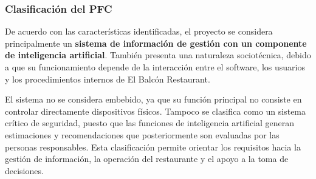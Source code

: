 \subsubsection{Clasificación del PFC}

De acuerdo con las características identificadas, el proyecto se considera
principalmente un \textbf{sistema de información de gestión con un componente
de inteligencia artificial}. También presenta una naturaleza sociotécnica,
debido a que su funcionamiento depende de la interacción entre el software,
los usuarios y los procedimientos internos de El Balcón Restaurant.

El sistema no se considera embebido, ya que su función principal no consiste
en controlar directamente dispositivos físicos. Tampoco se clasifica como un
sistema crítico de seguridad, puesto que las funciones de inteligencia
artificial generan estimaciones y recomendaciones que posteriormente son
evaluadas por las personas responsables. Esta clasificación permite orientar
los requisitos hacia la gestión de información, la operación del restaurante
y el apoyo a la toma de decisiones.

